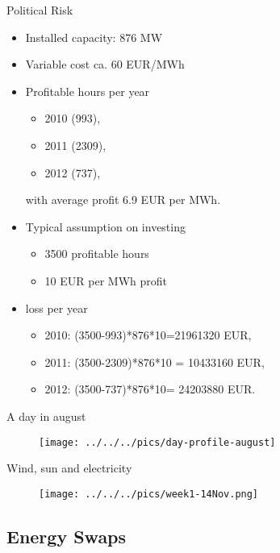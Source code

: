 {Political Risk}
\begin{itemize}
\item<1-> Installed capacity: 876 MW
\item<2-> Variable cost ca. 60 EUR/MWh
\item<3-> Profitable hours per year
\begin{itemize}
\item  2010 (993),
\item 2011 (2309),
\item 2012 (737),
\end{itemize}
with average profit 6.9 EUR per MWh.
\item<4-> Typical assumption on investing
\begin{itemize}
\item 3500 profitable hours
\item 10 EUR per MWh profit
\end{itemize}
\item<5-> loss per year
\begin{itemize}
\item  2010: (3500-993)*876*10=21961320 EUR,
\item 2011:  (3500-2309)*876*10 = 10433160 EUR,
\item 2012: (3500-737)*876*10= 24203880 EUR.
\end{itemize}

\end{itemize}





{A day in august}
\begin{figure}[htp]
\centering
\texttt{[image: ../../../pics/day-profile-august]}
\end{figure}




{Wind, sun and electricity}
\begin{figure}[htp]
\centering
\texttt{[image: ../../../pics/week1-14Nov.png]}
\end{figure}


\subsection{Energy Swaps}


